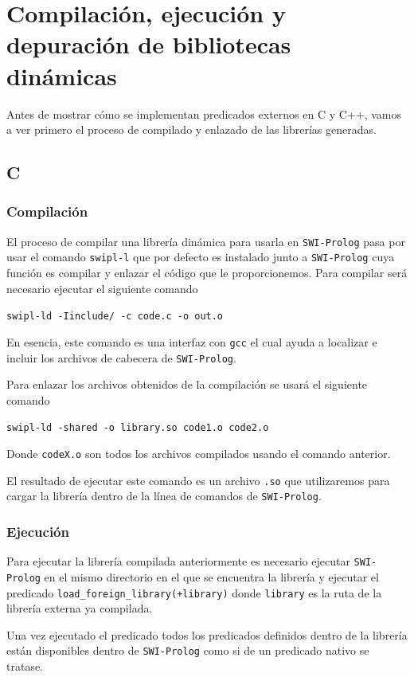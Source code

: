 \documentclass[a4paper]{article}
\begin{document}
\section{Compilación, ejecución y depuración de bibliotecas dinámicas}

Antes de mostrar cómo se implementan predicados externos en C y C++, vamos a ver primero el proceso de compilado y enlazado de las librerías generadas.
\subsection{C}
\subsubsection{Compilación}
El proceso de compilar una librería dinámica para usarla en \texttt{SWI-Prolog} pasa por usar el comando \texttt{swipl-l} que por defecto es instalado junto a \texttt{SWI-Prolog} cuya función es compilar y enlazar el código que le proporcionemos.
Para compilar será necesario ejecutar el siguiente comando

\texttt{swipl-ld -Iinclude/ -c code.c -o out.o}

En esencia, este comando es una interfaz con \texttt{gcc} el cual ayuda a localizar e incluir los archivos de cabecera de \texttt{SWI-Prolog}.

Para enlazar los archivos obtenidos de la compilación se usará el siguiente comando

\texttt{swipl-ld -shared -o library.so code1.o code2.o}

Donde \texttt{codeX.o} son todos los archivos compilados usando el comando anterior.

El resultado de ejecutar este comando es un archivo \texttt{.so} que utilizaremos para cargar la librería dentro de la línea de comandos de \texttt{SWI-Prolog}.

\subsubsection{Ejecución}
Para ejecutar la librería compilada anteriormente es necesario ejecutar \texttt{SWI-Prolog} en el mismo directorio en el que se encuentra la librería y ejecutar el predicado \texttt{load\_foreign\_library(+library)} donde \texttt{library} es la ruta de la librería externa ya compilada.

Una vez ejecutado el predicado todos los predicados definidos dentro de la librería están disponibles dentro de \texttt{SWI-Prolog} como si de un predicado nativo se tratase.
\end{document}
